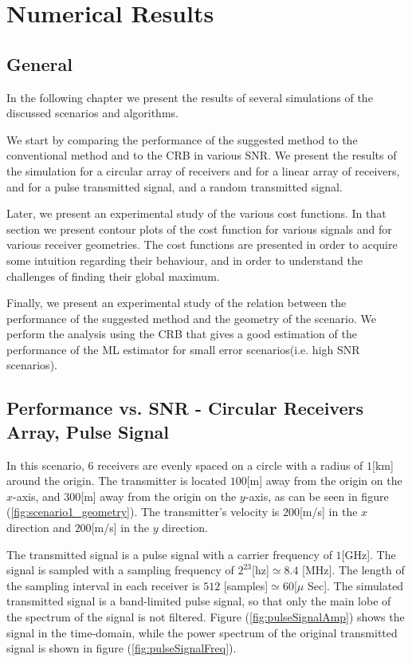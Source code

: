 

\chapter{Numerical Results} %
\label{Chapter6}

\section{General}
In the following chapter we present the results of several simulations of the discussed scenarios and algorithms.

We start by comparing the performance of the suggested method to the conventional method and to the CRB in various SNR. We present the results of the simulation for a circular array of receivers and for a linear array of receivers, and for a pulse transmitted signal, and a random transmitted signal.

Later, we present an experimental study of the various cost functions. In that section we present contour plots of the cost function for various signals and for various receiver geometries. The cost functions are presented in order to acquire some intuition regarding their behaviour, and in order to understand the challenges of finding their global maximum. 

Finally, we present an experimental study of the relation between the performance of the suggested method and the geometry of the scenario. We perform the analysis using the CRB that gives a good estimation of the performance of the ML estimator for small error scenarios(i.e. high SNR scenarios).

\section{Performance vs. SNR - Circular Receivers Array, Pulse Signal}
\label{sec:performance_vs_snr_circular_pulse}
In this scenario, $6$ receivers are evenly spaced on a circle with a radius of $1$[km] around the origin.
The transmitter is located $100$[m] away from the origin on the $x$-axis, and $300$[m] away from the origin on the $y$-axis, as can be seen in figure (\ref{fig:scenario1_geometry}).
The transmitter's velocity is $200$[m/s] in the $x$ direction and $200$[m/s] in the $y$ direction.

The transmitted signal is a pulse signal with a carrier frequency of $1$[GHz].
The signal is sampled with a sampling frequency of $2^{23}$[hz]$ \simeq 8.4$ [MHz].
The length of the sampling interval in each receiver is $512$ [samples]$ \simeq 60 $[$\mu$ Sec].
The simulated transmitted signal is a band-limited pulse signal, so that only the main lobe of the spectrum of the signal is not filtered. Figure (\ref{fig:pulseSignalAmp}) shows the signal in the time-domain, while the power spectrum of the original transmitted signal is shown in figure (\ref{fig:pulseSignalFreq}).

